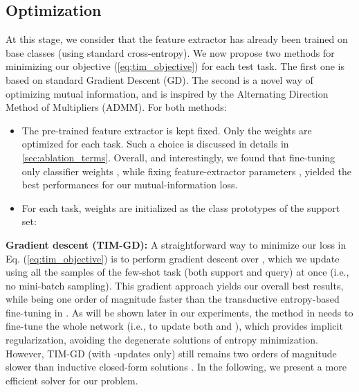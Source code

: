 \documentclass{article}
\begin{document}
    	\subsection{Optimization}\label{sec:optim}
            At this stage, we consider that the feature extractor has already been trained on base classes (using standard cross-entropy). We now propose two methods for minimizing our objective (\ref{eq:tim_objective}) for each test task. The first one is based on standard Gradient Descent (GD). The second is a novel way of optimizing mutual information, and is inspired by the Alternating Direction Method of Multipliers (ADMM). For both methods:
            \begin{itemize}
                \item The pre-trained feature extractor  is kept fixed. Only the weights  are optimized for each task. Such a choice is discussed in details in \autoref{sec:ablation_terms}. Overall, and interestingly, we found that fine-tuning only classifier weights , while fixing feature-extractor parameters , yielded the best performances for our mutual-information loss.
\item For each task, weights  are initialized as the class prototypes of the support set: 
                
            \end{itemize}
            
    
            \textbf{Gradient descent (TIM-GD):} A straightforward way to minimize our loss in Eq. (\ref{eq:tim_objective}) is to perform gradient descent over , which 
we  update using all the samples of the few-shot task (both support and query) at once (i.e., no mini-batch sampling). This gradient approach yields our overall best results, while being one order of magnitude faster than the transductive entropy-based fine-tuning in \cite{dhillon2019baseline}. As will be shown later in our experiments, the method in \cite{dhillon2019baseline} needs to fine-tune the whole network (i.e., to update both  and ), which provides implicit regularization, avoiding the degenerate solutions of entropy minimization. However, TIM-GD (with -updates only) still remains two orders of magnitude slower than inductive closed-form solutions \cite{prototypical_nets}. In the following, we present a more efficient solver for our problem.
            
\end{document}
